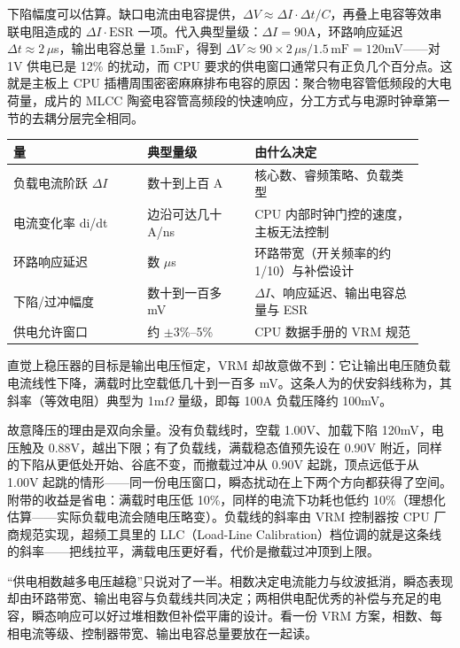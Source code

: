 下陷幅度可以估算。缺口电流由电容提供，$\Delta V \approx \Delta I \cdot \Delta t / C$，再叠上电容等效串联电阻造成的 $\Delta I \cdot \mathrm{ESR}$ 一项。代入典型量级：$\Delta I = 90$A，环路响应延迟 $\Delta t \approx 2\,\mu$s，输出电容总量 $1.5$mF，得到 $\Delta V \approx 90 \times 2\,\mu\mathrm{s} / 1.5\,\mathrm{mF} = 120$mV——对 1V 供电已是 12\% 的扰动，而 CPU 要求的供电窗口通常只有正负几个百分点。这就是主板上 CPU 插槽周围密密麻麻排布电容的原因：聚合物电容管低频段的大电荷量，成片的 MLCC 陶瓷电容管高频段的快速响应，分工方式与电源时钟章第一节的去耦分层完全相同。

\begin{longtable}{L{0.30\linewidth}L{0.24\linewidth}L{0.38\linewidth}}
\toprule
量 & 典型量级 & 由什么决定 \\
\midrule
负载电流阶跃 $\Delta I$ & 数十到上百 A & 核心数、睿频策略、负载类型 \\
电流变化率 di/dt & 边沿可达几十 A/ns & CPU 内部时钟门控的速度，主板无法控制 \\
环路响应延迟 & 数 $\mu$s & 环路带宽（开关频率的约 1/10）与补偿设计 \\
下陷/过冲幅度 & 数十到一百多 mV & $\Delta I$、响应延迟、输出电容总量与 ESR \\
供电允许窗口 & 约 $\pm$3\%--5\% & CPU 数据手册的 VRM 规范 \\
\bottomrule
\end{longtable}


直觉上稳压器的目标是输出电压恒定，VRM 却故意做不到：它让输出电压随负载电流线性下降，满载时比空载低几十到一百多 mV。这条人为的伏安斜线称为，其斜率（等效电阻）典型为 1m$\Omega$ 量级，即每 100A 负载压降约 100mV。

故意降压的理由是双向余量。没有负载线时，空载 1.00V、加载下陷 120mV，电压触及 0.88V，越出下限；有了负载线，满载稳态值预先设在 0.90V 附近，同样的下陷从更低处开始、谷底不变，而撤载过冲从 0.90V 起跳，顶点远低于从 1.00V 起跳的情形——同一份电压窗口，瞬态扰动在上下两个方向都获得了空间。附带的收益是省电：满载时电压低 10\%，同样的电流下功耗也低约 10\%（理想化估算——实际负载电流会随电压略变）。负载线的斜率由 VRM 控制器按 CPU 厂商规范实现，超频工具里的 LLC（Load-Line Calibration）档位调的就是这条线的斜率——把线拉平，满载电压更好看，代价是撤载过冲顶到上限。

\begin{warningbox}
“供电相数越多电压越稳”只说对了一半。相数决定电流能力与纹波抵消，瞬态表现却由环路带宽、输出电容与负载线共同决定；两相供电配优秀的补偿与充足的电容，瞬态响应可以好过堆相数但补偿平庸的设计。看一份 VRM 方案，相数、每相电流等级、控制器带宽、输出电容总量要放在一起读。
\end{warningbox}

